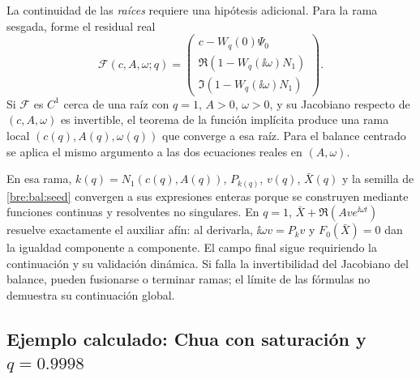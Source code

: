 La continuidad de las \emph{raíces} requiere una hipótesis adicional.
Para la rama sesgada, forme el residual real
\begin{equation}
 \mathcal F(c,A,\omega;q)=\begin{pmatrix}
 c-W_q(0)\Psi_0\\
 \Re(1-W_q(\ii\omega)N_1)\\
 \Im(1-W_q(\ii\omega)N_1)
 \end{pmatrix}.
 \label{bre:bal:branch-residual}
\end{equation}
Si \(\mathcal F\) es \(C^1\) cerca de una raíz con \(q=1\),
\(A>0\), \(\omega>0\), y su Jacobiano respecto de
\((c,A,\omega)\) es invertible, el teorema de la función implícita
produce una rama local \((c(q),A(q),\omega(q))\) que converge a
esa raíz. Para el balance centrado se aplica el mismo argumento a
las dos ecuaciones reales en \((A,\omega)\).

En esa rama, \(k(q)=N_1(c(q),A(q))\), \(P_{k(q)}\), \(v(q)\),
\(\bar X(q)\) y la semilla de \eqref{bre:bal:seed} convergen a sus
expresiones enteras porque se construyen mediante funciones continuas
y resolventes no singulares. En \(q=1\),
\(\bar X+\Re(Av e^{\ii\omega t})\) resuelve exactamente el auxiliar
afín: al derivarla, \(\ii\omega v=P_kv\) y \(F_0(\bar X)=0\)
dan la igualdad componente a componente. El campo final sigue
requiriendo la continuación y su validación dinámica. Si falla la
invertibilidad del Jacobiano del balance, pueden fusionarse o terminar
ramas; el límite de las fórmulas no demuestra su continuación global.

\subsection{Ejemplo calculado: Chua con saturación y \texorpdfstring{\(q=0.9998\)}{q=0.9998}}
\label{bre:bal:example}


